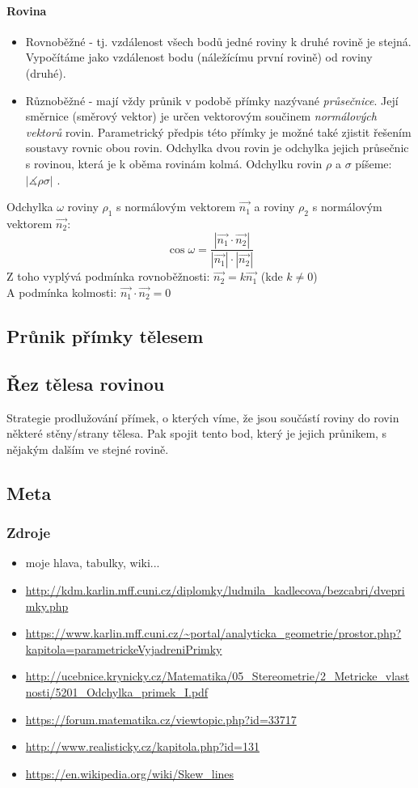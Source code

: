 \documentclass[12pt]{article}
\begin{document}
\paragraph{Rovina}
\begin{itemize}
\item Rovnoběžné - tj. vzdálenost všech bodů jedné roviny k druhé rovině je stejná. Vypočítáme jako vzdálenost bodu (náležícímu první rovině) od roviny (druhé).
\item Různoběžné - mají vždy průnik v podobě přímky nazývané \emph{průsečnice}. Její směrnice (směrový vektor) je určen vektorovým součinem \emph{normálových vektorů} rovin. Parametrický předpis této přímky je možné také zjistit řešením soustavy rovnic obou rovin. Odchylka dvou rovin je odchylka jejich průsečnic s rovinou, která je k oběma rovinám kolmá. Odchylku rovin $\rho$ a $\sigma$ píšeme: $| \measuredangle  \rho \sigma|$ .
\end{itemize}
Odchylka $\omega$ roviny $\rho_1$ s normálovým vektorem $\vec{n_1}$ a roviny $\rho_2$ s normálovým vektorem $\vec{n_2}$:
\begin{equation}
\cos \omega = \frac{|\vec{n_1}\cdot\vec{n_2}|}{|\vec{n_1}|\cdot|\vec{n_2}|}
\end{equation}
Z toho vyplývá podmínka rovnoběžnosti: $\vec{n_2} = k \vec{n_1}$ (kde $k \neq 0$)\\
A podmínka kolmosti: $\vec{n_1} \cdot \vec{n_2} = 0$
\subsection{Průnik přímky tělesem}
\subsection{Řez tělesa rovinou}
Strategie prodlužování přímek, o kterých víme, že jsou součástí roviny do rovin některé stěny/strany tělesa. Pak spojit tento bod, který je jejich průnikem, s nějakým dalším ve stejné rovině.
\subsection{Meta}
\subsubsection{Zdroje}
\begin{itemize}
\item moje hlava, tabulky, wiki...
\item \url{http://kdm.karlin.mff.cuni.cz/diplomky/ludmila_kadlecova/bezcabri/dveprimky.php}
\item \url{https://www.karlin.mff.cuni.cz/~portal/analyticka_geometrie/prostor.php?kapitola=parametrickeVyjadreniPrimky}
\item \url{http://ucebnice.krynicky.cz/Matematika/05_Stereometrie/2_Metricke_vlastnosti/5201_Odchylka_primek_I.pdf}
\item \url{https://forum.matematika.cz/viewtopic.php?id=33717}
\item \url{http://www.realisticky.cz/kapitola.php?id=131}
\item \url{https://en.wikipedia.org/wiki/Skew_lines}
\end{itemize}
\end{document}
